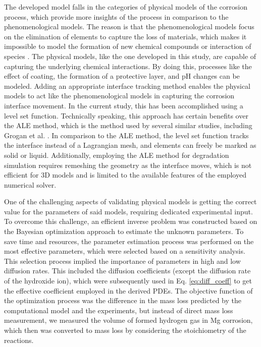 The developed model falls in the categories of physical models of the corrosion process, which provide more insights of the process in comparison to the phenomenological models. The reason is that the phenomenological models focus on the elimination of elements to capture the loss of materials, which makes it impossible to model the formation of new chemical compounds or interaction of species \cite{Abdalla2020}. The physical models, like the one developed in this study, are capable of capturing the underlying chemical interactions. By doing this, processes like the effect of coating, the formation of a protective layer, and pH changes can be modeled. Adding an appropriate interface tracking method enables the physical models to act like the phenomenological models in capturing the corrosion interface movement. In the current study, this has been accomplished using a level set function. Technically speaking, this approach has certain benefits over the  {ALE} method,  which is the method used by several similar studies, including Grogan et al. \cite{Grogan2014}. In comparison to the {ALE} method, the level set function tracks the interface instead of a Lagrangian mesh, and elements can freely be marked as solid or liquid. Additionally, employing the {ALE} method for degradation simulation requires remeshing the geometry as the interface moves, which is not efficient for 3D models and is limited to the available features of the employed numerical solver.

One of the challenging aspects of validating physical models is getting the correct value for the parameters of said models, requiring dedicated experimental input. To overcome this challenge, an efficient inverse problem was constructed based on the Bayesian optimization approach to estimate the unknown parameters. To save time and resources, the parameter estimation process was performed on the most effective parameters, which were selected based on a sensitivity analysis. This selection process implied the importance of parameters in high and low diffusion rates. This included the diffusion coefficients (except the diffusion rate of the hydroxide ion), which were subsequently used in Eq. \ref{eq:diff_coeff} to get the effective coefficient employed in the derived {PDE}s. The objective function of the optimization process was the difference in the mass loss predicted by the computational model and the experiments, but instead of direct mass loss measurement, we measured the volume of formed hydrogen gas in Mg corrosion, which then was converted to mass loss by considering the stoichiometry of the reactions.


